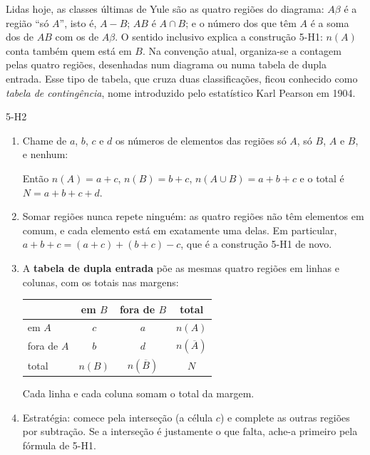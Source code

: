 Lidas hoje, as classes últimas de Yule são as quatro regiões do diagrama: $A\beta$ é a região \enquote{só $A$}, isto é, $A-B$; $AB$ é $A\cap B$; e o número dos que têm $A$ é a soma dos de $AB$ com os de $A\beta$. O sentido inclusivo explica a construção 5-H1: $n(A)$ conta também quem está em $B$. Na convenção atual, organiza-se a contagem pelas quatro regiões, desenhadas num diagrama ou numa tabela de dupla entrada. Esse tipo de tabela, que cruza duas classificações, ficou conhecido como \emph{tabela de contingência}, nome introduzido pelo estatístico Karl Pearson em 1904.

\begin{construcao}{5-H2}
\begin{enumerate}[label=(\arabic*)]
  \item Chame de $a$, $b$, $c$ e $d$ os números de elementos das regiões só $A$, só $B$, $A$ e $B$, e nenhum:
\begin{center}
\end{center}
Então $n(A)=a+c$, $n(B)=b+c$, $n(A\cup B)=a+b+c$ e o total é $N=a+b+c+d$.
  \item Somar regiões nunca repete ninguém: as quatro regiões não têm elementos em comum, e cada elemento está em exatamente uma delas. Em particular, $a+b+c=(a+c)+(b+c)-c$, que é a construção 5-H1 de novo.
  \item A \textbf{tabela de dupla entrada} põe as mesmas quatro regiões em linhas e colunas, com os totais nas margens:
\begin{center}
\begin{tabular}{l|cc|c}
 & em $B$ & fora de $B$ & total\\\hline
em $A$ & $c$ & $a$ & $n(A)$\\
fora de $A$ & $b$ & $d$ & $n(\overline{A})$\\\hline
total & $n(B)$ & $n(\overline{B})$ & $N$
\end{tabular}
\end{center}
Cada linha e cada coluna somam o total da margem.
  \item Estratégia: comece pela interseção (a célula $c$) e complete as outras regiões por subtração. Se a interseção é justamente o que falta, ache-a primeiro pela fórmula de 5-H1.
\end{enumerate}
\end{construcao}

